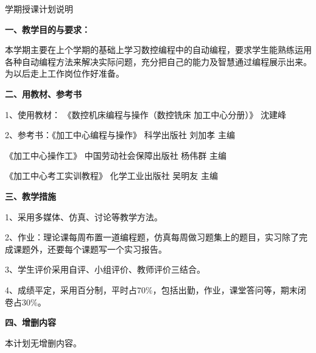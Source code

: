 \documentclass{ctexart}
\begin{document}

\jhsy %

\begin{center}
 \heiti 学期授课计划说明
\end{center}
 \setlength{\parindent}{2em} \setlength{\baselineskip}{22pt}

\textbf{一、教学目的与要求：}

本学期主要在上个学期的基础上学习数控编程中的自动编程，要求学生能熟练运用各种自动编程方法来解决实际问题，充分把自己的能力及智慧通过编程展示出来。为以后走上工作岗位作好准备。

\textbf{二、用教材、参考书}

1、使用教材： 《数控机床编程与操作（数控铣床 加工中心分册）》 沈建峰

2、参考书：《加工中心编程与操作》  科学出版社  刘加孝   主编

\hspace{5em}《加工中心操作工》 中国劳动社会保障出版社  杨伟群  主编

\hspace{5em}《加工中心考工实训教程》  化学工业出版社   吴明友 主编

\textbf{三、教学措施}

1、采用多媒体、仿真、讨论等教学方法。

2、作业：理论课每周布置一道编程题，仿真每周做习题集上的题目，实习除了完成课题外，还要每个课题写一个实习报告。

3、学生评价采用自评、小组评价、教师评价三结合。

4、成绩平定，采用百分制，平时占70\%，包括出勤，作业，课堂答问等，期末闭卷占30\%。

\textbf{四、增删内容}

本计划无增删内容。
\end{document}
